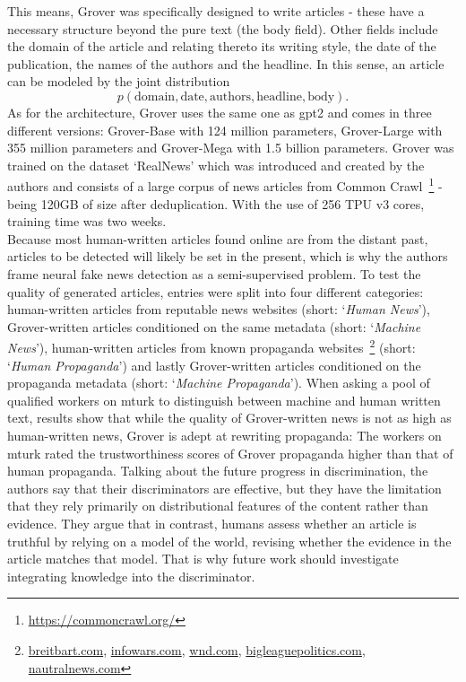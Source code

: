 This means, Grover was specifically designed to write articles - these have a necessary structure beyond the pure text (the body field). Other fields include the domain of the article and relating thereto its writing style, the date of the publication, the names of the authors and the headline. In this sense, an article can be modeled by the joint distribution
\begin{equation}
	p(\text{domain}, \text{date}, \text{authors}, \text{headline}, \text{body}).
\end{equation}
As for the architecture, Grover uses the same one as \gls{gpt2} and comes in three different versions: Grover-Base with 124 million parameters, Grover-Large with 355 million parameters and Grover-Mega with 1.5 billion parameters. Grover was trained on the dataset `RealNews' which was introduced and created by the authors and consists of a large corpus of news articles from Common Crawl~\footnote{\url{https://commoncrawl.org/}} - being 120GB of size after deduplication. With the use of 256 TPU v3 cores, training time was two weeks. \\
Because most human-written articles found online are from the distant past, articles to be detected will likely be set in the present, which is why the authors frame neural fake news detection as a semi-supervised problem. To test the quality of generated articles, entries were split into four different categories: human-written articles from reputable news websites (short: `\textit{Human News}'), Grover-written articles conditioned on the same metadata (short: `\textit{Machine News}'), human-written articles from known propaganda websites~\footnote{\url{breitbart.com}, \url{infowars.com}, \url{wnd.com}, \url{bigleaguepolitics.com}, \url{nautralnews.com}} (short: `\textit{Human Propaganda}') and lastly Grover-written articles conditioned on the propaganda metadata (short: `\textit{Machine Propaganda}'). When asking a pool of qualified workers on \gls{mturk} to distinguish between machine and human written text, results show that while the quality of Grover-written news is not as high as human-written news, Grover is adept at rewriting propaganda: The workers on \gls{mturk} rated the trustworthiness scores of Grover propaganda higher than that of human propaganda. Talking about the future progress in discrimination, the authors say that their discriminators are effective, but they have the limitation that they rely primarily on distributional features of the content rather than evidence. They argue that in contrast, humans assess whether an article is truthful by relying on a model of the world, revising whether the evidence in the article matches that model. That is why future work should investigate integrating knowledge into the discriminator.
